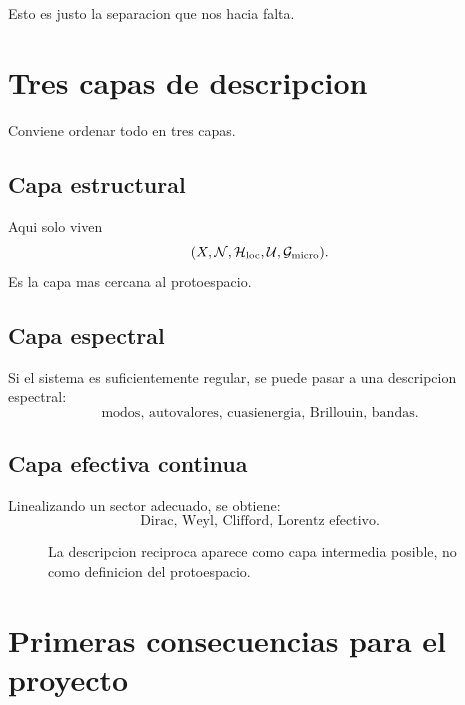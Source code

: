 Esto es justo la separacion que nos hacia falta.

\section{Tres capas de descripcion}
Conviene ordenar todo en tres capas.

\subsection{Capa estructural}
Aqui solo viven
\[
(X,\mathcal{N},\mathcal{H}_{\mathrm{loc}},\mathcal{U},\mathcal{G}_{\mathrm{micro}}).
\]
Es la capa mas cercana al protoespacio.

\subsection{Capa espectral}
Si el sistema es suficientemente regular, se puede pasar a una descripcion espectral:
\[
\text{modos, autovalores, cuasienergia, Brillouin, bandas.}
\]

\subsection{Capa efectiva continua}
Linealizando un sector adecuado, se obtiene:
\[
\text{Dirac, Weyl, Clifford, Lorentz efectivo.}
\]

\begin{figure}[h!]
\centering
{}
\caption{La descripcion reciproca aparece como capa intermedia posible, no como definicion del protoespacio.}
\end{figure}

\section{Primeras consecuencias para el proyecto}
